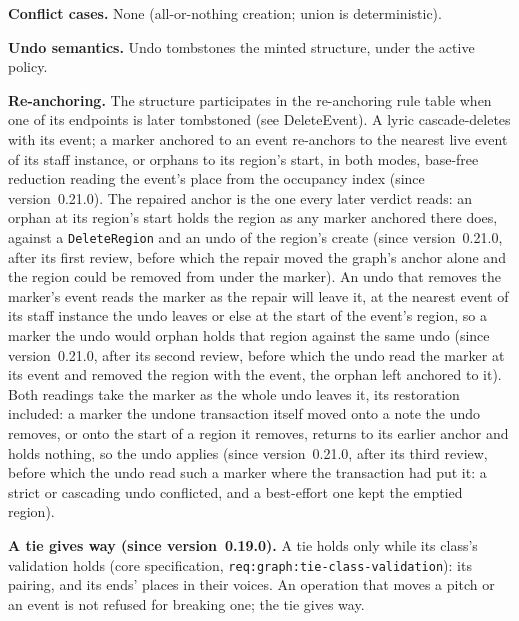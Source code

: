 \documentclass[11pt,letterpaper]{report}
\begin{document}
\textbf{Conflict cases.} None (all-or-nothing creation; union is deterministic).

\textbf{Undo semantics.} Undo tombstones the minted structure, under the active
policy.

\textbf{Re-anchoring.} The structure participates in the re-anchoring rule table
when one of its endpoints is later tombstoned (see DeleteEvent). A lyric
cascade-deletes with its event; a marker anchored to an event re-anchors to
the nearest live event of its staff instance, or orphans to its region's
start, in both modes, base-free reduction reading the event's place from the
occupancy index (since version~0.21.0). The repaired anchor is the one every
later verdict reads: an orphan at its region's start holds the region as any
marker anchored there does, against a \texttt{DeleteRegion} and an undo of the
region's create (since version~0.21.0, after its first review, before which
the repair moved the graph's anchor alone and the region could be removed from
under the marker). An undo that removes the marker's event reads the marker as
the repair will leave it, at the nearest event of its staff instance the undo
leaves or else at the start of the event's region, so a marker the undo would
orphan holds that region against the same undo (since version~0.21.0, after
its second review, before which the undo read the marker at its event and
removed the region with the event, the orphan left anchored to it). Both
readings take the marker as the whole undo leaves it, its restoration
included: a marker the undone transaction itself moved onto a note the undo
removes, or onto the start of a region it removes, returns to its earlier
anchor and holds nothing, so the undo applies (since version~0.21.0, after its
third review, before which the undo read such a marker where the transaction
had put it: a strict or cascading undo conflicted, and a best-effort one kept
the emptied region).

\textbf{A tie gives way (since version~0.19.0).} A tie holds only while its
class's validation holds (core specification,
\texttt{req:graph:tie-class-validation}): its pairing, and its ends' places in
their voices. An operation that moves a pitch or an event is not refused for
breaking one; the tie gives way.
\end{document}
